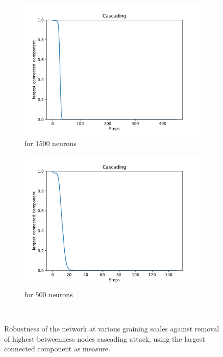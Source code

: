 \begin{figure}
\begin{subfigure}[b]{0.45\textwidth}
		\centering
		\includegraphics[width=\textwidth]{Images/plots_cascading/cascading_38.pdf}
		\caption{for $1500$ neurons}
	\end{subfigure}
	\hfill
	\begin{subfigure}[b]{0.45\textwidth}
		\centering
		\includegraphics[width=\textwidth]{Images/plots_cascading/cascading_40.pdf}
		\caption{for $500$ neurons}
	\end{subfigure}
	\\ \vspace{5mm}
	
	
	\caption{Robustness of the network at various graining scales against removal of highest-betweenness nodes cascading attack, using the largest connected component as measure.}
	\label{fig:cascading_atk}
\end{figure}

